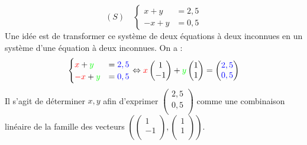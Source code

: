 \documentclass{book}
\begin{document}
\begin{Texte}
\begin{Exemple}
$$(S)\quad \begin{cases}
x+y&=2,5\\
-x+y&=0,5
\end{cases}
$$
Une idée est de transformer ce système de deux équations à deux inconnues en un système d'une équation à deux inconnues. On a :\\
$$\begin{cases}
{\color{red}x}+{\color{green}y}&={\color{blue}2,5}\\
{\color{red}-x}+{\color{green}y}&={\color{blue}0,5}
\end{cases}
\Leftrightarrow
	 {\color{red}x}\begin{pmatrix}
 1    \\
 -1   \\
\end{pmatrix}+{\color{green}y}\begin{pmatrix}
  1   \\
  1  \\
\end{pmatrix}=\begin{pmatrix}
 {\color{blue}2,5}   \\
 {\color{blue}0,5}  \\
\end{pmatrix}$$
Il s'agit de déterminer $x,y$ afin d'exprimer $\begin{pmatrix}
 2,5   \\
 0,5  \\
\end{pmatrix}$  comme une combinaison linéaire de la famille des vecteurs $(\begin{pmatrix}
 1    \\
 -1   \\
\end{pmatrix},\begin{pmatrix}
 1   \\
  1  \\
\end{pmatrix})$. 
\begin{center}
\end{center}
\end{Exemple}
\end{Texte}
\end{document}
